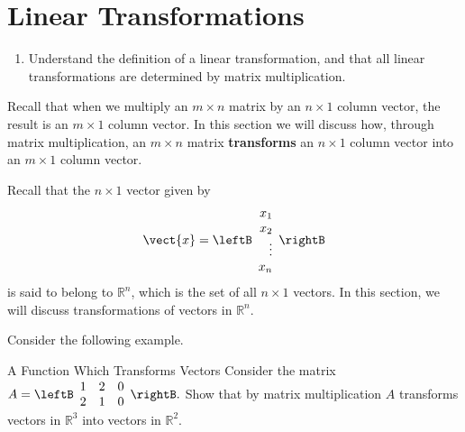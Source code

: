 \section{Linear Transformations}

\begin{outcome}
\begin{enumerate}
\item[A.]  Understand the definition of a linear transformation, and that all linear transformations are determined by matrix multiplication.
\end{enumerate}
\end{outcome}

Recall that when we multiply an $m\times n$ matrix by an $n\times 1 $
column vector, the result is an $m\times 1$ column vector. In this
section we will discuss how, through matrix multiplication, an $m
\times n$ matrix \textbf{transforms} an $n\times 1$ column vector into
an $m \times 1$ column vector.

Recall that the $n \times 1$ vector given by
\begin{equation*}
\vect{x} = 
\leftB
\begin{array}{r}
x_1 \\
x_2\\ 
\vdots \\
x_n
\end{array}
\rightB
\end{equation*}
is said to belong to $\mathbb{R}^n$, which is the set of all $n \times 1$ vectors. In this section, we will discuss transformations of vectors in $\mathbb{R}^n.$ 

Consider the following example. 

\begin{example}{A Function Which Transforms Vectors}\label{exa:functiontransformation}
Consider the matrix $A = \leftB
\begin{array}{ccc}
1 & 2 & 0 \\
2 & 1 & 0
\end{array}
\rightB .$ 
Show that by matrix multiplication $A$ transforms vectors in $\mathbb{R}^3$ into vectors in $\mathbb{R}^2$.
\end{example}

